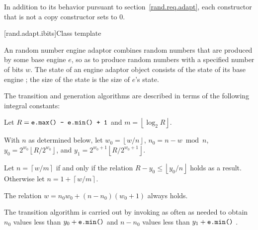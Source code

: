 \pnum
In addition to its behavior
pursuant to section~\ref{rand.req.adapt},
each constructor%
that is not a copy constructor
sets  to $0$.


[rand.adapt.ibits]{Class template }%
%

\pnum
An 
random number engine adaptor
combines random numbers
that are produced by some base engine $e$,
so as to produce random numbers
with a specified number of bits $w$.
The state%
%
of an 
engine adaptor object 
consists of
 the state  of its base engine ;
the size of the state is
 the size of $e$'s state.

\pnum
The transition and generation algorithms
are described in terms
of the following integral constants:%
\begin{enumeratea}
 \item
   Let
     $ R = \texttt{e.max() - e.min() + 1} $
   and
     $ m = \left\lfloor \log_2 R \right\rfloor $.
 \item
   With $n$ as determined below,
   let
     $ w_0 = \left\lfloor w / n \right\rfloor $,
     $ n_0 = n - w \bmod n $,
     $ y_0 = 2^{w_0} \left\lfloor R / 2^{w_0} \right\rfloor $,
   and
     $ y_1 = 2^{w_0 + 1} \left\lfloor R / 2^{w_0 + 1} \right\rfloor $.
 \item
   Let
     $ n = \left\lceil w / m \right\rceil $
   if and only if the relation
     $ R - y_0 \leq \left\lfloor y_0 / n \right\rfloor $
   holds as a result.
   Otherwise let
     $ n = 1 + \left\lceil w / m \right\rceil $.
\end{enumeratea}
\begin{note}
 The relation
 $ w = n_0 w_0 + (n - n_0)(w_0 + 1) $
 always holds.
\end{note}

\pnum
The transition algorithm%
%
is carried out
by invoking 
as often as needed
to obtain
 $ n_0 $
values less than
$ y_0 + \texttt{e.min()} $
and
 $ n - n_0 $
values less than $ y_1 + \texttt{e.min()} $%
.


